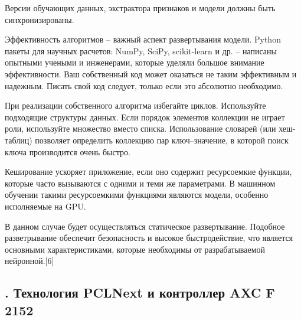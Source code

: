 {	\par \redline Версии обучающих данных, экстрактора признаков и модели должны быть синхронизированы.

	\par \redline Эффективность алгоритмов {--} важный аспект развертывания модели.	Python пакеты для научных расчетов: NumPy, SciPy, scikit-learn и др. {--} написаны опытными учеными и инженерами, которые уделяли большое внимание эффективности. Ваш собственный код может оказаться не таким эффективным и надежным. Писать свой код следует, только если это абсолютно необходимо.

	\par \redline При реализации собственного алгоритма избегайте циклов. Используйте подходящие структуры данных. Если порядок элементов коллекции не играет роли, используйте множество вместо списка. Использование словарей (или хеш-таблиц) позволяет определить коллекцию пар ключ–значение, в которой поиск ключа производится очень быстро.

	\par \redline Кеширование ускоряет приложение, если оно содержит ресурсоемкие функции, которые часто вызываются с одними и теми же параметрами. В машинном обучении такими ресурсоемкими функциями являются модели, особенно исполняемые на GPU.

	\par \redline В данном случае будет осуществляться статическое развертывание. Подобное разветрывание обеспечит безопасность и высокое быстродействие, что является основными характеристиками, которые необходимы от разрабатываемой нейронной.[6]

	\par
}

\subtitlespace

\subsection*{
	\gostTitleFont
	\redline
	\thechaptercntr .\thesubchaptercntr \spc
	Технология PCLNext и контроллер AXC F 2152
} \addtocounter{subchaptercntr}{1}

\subtitlespace

